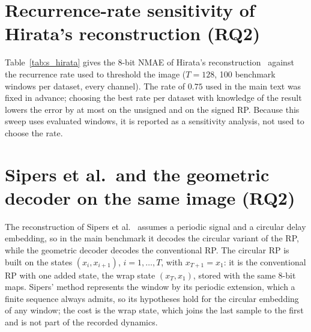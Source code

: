 \documentclass[preprint,12pt]{elsarticle}
\begin{document}
\begin{table}[H]
\centering
\caption{Spectral and correlational fidelity after 8-bit storage: range of the dataset means over the seven datasets at $T=128$. Pearson: correlation with the original; PSD shape: $L_1$ distance between unit-mass Welch spectra; Energy: relative error of total power.}\label{tab:s_spectral}
\footnotesize

\end{table}

\section{Recurrence-rate sensitivity of Hirata's reconstruction (RQ2)}\label{sec:s_hirata}
Table~\ref{tab:s_hirata} gives the 8-bit NMAE of Hirata's reconstruction~\cite{hirata2008reproduction} against the recurrence rate used to threshold the image ($T=128$, 100 benchmark windows per dataset, every channel). The rate of $0.75$ used in the main text was fixed in advance; choosing the best rate per dataset with knowledge of the result lowers the error by at most \hirataGainUns{} on the unsigned and \hirataGainSig{} on the signed RP. Because this sweep uses evaluated windows, it is reported as a sensitivity analysis, not used to choose the rate.

\begin{table}[H]
\centering
\caption{Hirata's reconstruction: 8-bit NMAE against the recurrence rate.}\label{tab:s_hirata}
\scriptsize
\setlength{\tabcolsep}{3pt}

\end{table}

\section{Sipers et al.\ and the geometric decoder on the same image (RQ2)}\label{sec:s_sipers}
The reconstruction of Sipers et al.~\cite{sipers2017robust} assumes a periodic signal and a circular delay embedding, so in the main benchmark it decodes the circular variant of the RP, while the geometric decoder decodes the conventional RP. The circular RP is built on the states $(x_i,x_{i+1})$, $i=1,\ldots,T$, with $x_{T+1}=x_1$: it is the conventional RP with one added state, the wrap state $(x_T,x_1)$, stored with the same 8-bit maps. Sipers' method represents the window by its periodic extension, which a finite sequence always admits, so its hypotheses hold for the circular embedding of any window; the cost is the wrap state, which joins the last sample to the first and is not part of the recorded dynamics.
\end{document}
